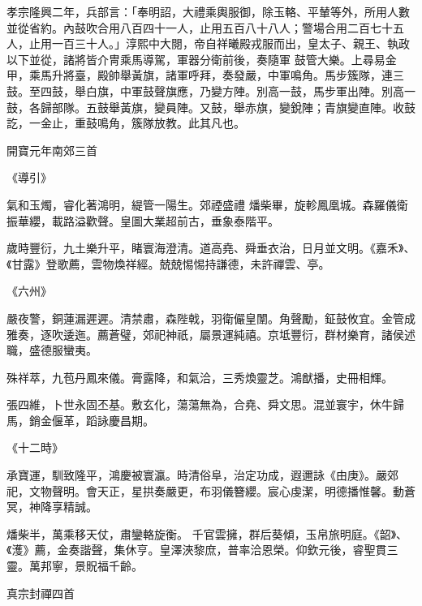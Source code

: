 \begin{pinyinscope}
 孝宗隆興二年，兵部言：「奉明詔，大禮乘輿服御，除玉輅、平輦等外，所用人數並從省約。內鼓吹合用八百四十一人，止用五百八十八人；警場合用二百七十五人，止用一百三十人。」淳熙中大閱，帝自祥曦殿戎服而出，皇太子、親王、執政以下並從，諸將皆介冑乘馬導駕，軍器分衛前後，奏隨軍
 鼓管大樂。上尋易金甲，乘馬升將臺，殿帥舉黃旗，諸軍呼拜，奏發嚴，中軍鳴角。馬步簇隊，連三鼓。至四鼓，舉白旗，中軍鼓聲旗應，乃變方陣。別高一鼓，馬步軍出陣。別高一鼓，各歸部隊。五鼓舉黃旗，變員陣。又鼓，舉赤旗，變銳陣；青旗變直陣。收鼓訖，一金止，重鼓鳴角，簇隊放教。此其凡也。



 開寶元年南郊三首



 《導引》



 氣和玉燭，睿化著鴻明，緹管一陽生。郊禋盛禮
 燔柴畢，旋軫鳳凰城。森羅儀衛振華纓，載路溢歡聲。皇圖大業超前古，垂象泰階平。



 歲時豐衍，九土樂升平，睹寰海澄清。道高堯、舜垂衣治，日月並文明。《嘉禾》、《甘露》登歌薦，雲物煥祥經。兢兢惕惕持謙德，未許禪雲、亭。



 《六州》



 嚴夜警，銅蓮漏遲遲。清禁肅，森陛戟，羽衛儼皇闈。角聲勵，鉦鼓攸宜。金管成雅奏，逐吹逶迤。薦蒼璧，郊祀神祇，屬景運純禧。京坻豐衍，群材樂育，諸侯述
 職，盛德服蠻夷。



 殊祥萃，九苞丹鳳來儀。膏露降，和氣洽，三秀煥靈芝。鴻猷播，史冊相輝。



 張四維，卜世永固丕基。敷玄化，蕩蕩無為，合堯、舜文思。混並寰宇，休牛歸馬，銷金偃革，蹈詠慶昌期。



 《十二時》



 承寶運，馴致隆平，鴻慶被寰瀛。時清俗阜，治定功成，遐邇詠《由庚》。嚴郊祀，文物聲明。會天正，星拱奏嚴更，布羽儀簪纓。宸心虔潔，明德播惟馨。動蒼冥，神降享精誠。



 燔柴半，萬乘移天仗，肅鑾輅旋衡。
 千官雲擁，群后葵傾，玉帛旅明庭。《韶》、《濩》薦，金奏諧聲，集休亨。皇澤浹黎庶，普率洽恩榮。仰欽元後，睿聖貫三靈。萬邦寧，景貺福千齡。



 真宗封禪四首




\end{pinyinscope}
